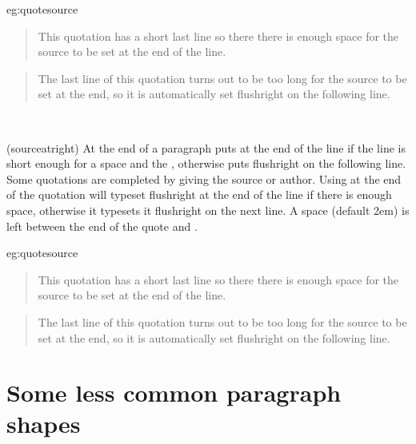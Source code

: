 \begin{egresult}{eg:quotesource}
\begin{quotation}
\hspace*{-0.5\parindent}This quotation has a short last line so there there is enough space 
for the source to be set at
the end of the line.
\end{quotation}

\begin{quotation}
The last line of this quotation turns out to be too long for
the source to be set at the end, so it is automatically
set flushright on the following line.
\end{quotation}
\end{egresult}

\begin{syntax}
\cmd{\sourceatright} \\
\end{syntax}
\glossary(sourceatright)%
  {}%
  {At the end of a paragraph puts  at the end of the line
   if the line is short enough for a space  and the ,
   otherwise puts  flushright on the following line.}
Some quotations are completed by giving the source or author. Using
\cmd{\sourceatright} at the end of the quotation will typeset 
flushright at the end of the line if there is enough space, otherwise it 
typesets it flushright on the next line. A space  (default 2em)
is left between the end of the quote and .

\begin{egsource}{eg:quotesource}
\begin{quotation}
This quotation has a short last line so there there is enough space 
for the source to be set at
the end of the line.
\end{quotation}

\begin{quotation}
The last line of this quotation turns out to be too long for
the source to be set at the end, so it is automatically
set flushright on the following line.
\end{quotation}
\end{egsource}

\section{Some less common paragraph shapes}

